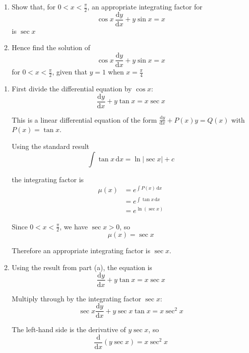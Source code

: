 \documentclass[leqno]{article}
\begin{document}
\begin{enumerate}[
  label=\textbf{\arabic*.},
  leftmargin=*,
  topsep=0pt,
  partopsep=0pt,
  parsep=0pt
]
\newpage

\questionitem

\begin{enumerate}[label=\textbf{(\alph*)}]
  \item Show that, for $0<x<\frac{\pi}{2}$, an appropriate integrating factor for
  \[
  \cos x\,\frac{\mathrm{d}y}{\mathrm{d}x}+y\sin x=x
  \]
  is $\sec x$  \\
  \item Hence find the solution of
  \[
  \cos x\,\frac{\mathrm{d}y}{\mathrm{d}x}+y\sin x=x
  \]
  for $0<x<\frac{\pi}{2}$, given that $y=1$ when $x=\frac{\pi}{4}$  \\
\end{enumerate}

\vspace*{10pt}

\begin{djsSolution}
\begin{enumerate}[label=\textbf{(\alph*)}]
  \item First divide the differential equation by $\cos x$:
\[
\frac{\mathrm{d}y}{\mathrm{d}x}+y\tan x=x\sec x
\]

This is a linear differential equation of the form \(\frac{\mathrm{d}y}{\mathrm{d}x}+P(x)y=Q(x)\) with \(P(x)=\tan x\).

Using the standard result
\[
\int \tan x\,\mathrm{d}x=\ln|\sec x|+c
\]

the integrating factor is
\begin{align*}
\mu(x)&=e^{\int P(x)\,\mathrm{d}x} \\
&=e^{\int \tan x\,\mathrm{d}x} \\
&=e^{\ln(\sec x)}
\end{align*}

Since $0<x<\frac{\pi}{2}$, we have $\sec x>0$, so
\[
\mu(x)=\sec x
\]

Therefore an appropriate integrating factor is $\sec x$.

  \item Using the result from part (a), the equation is
\[
\frac{\mathrm{d}y}{\mathrm{d}x}+y\tan x=x\sec x
\]

Multiply through by the integrating factor $\sec x$:
\[
\sec x\frac{\mathrm{d}y}{\mathrm{d}x}+y\sec x\tan x=x\sec^2 x
\]

The left-hand side is the derivative of $y\sec x$, so
\[
\frac{\mathrm{d}}{\mathrm{d}x}(y\sec x)=x\sec^2 x
\]


\end{enumerate}
\end{djsSolution}
\end{enumerate}
\end{document}
